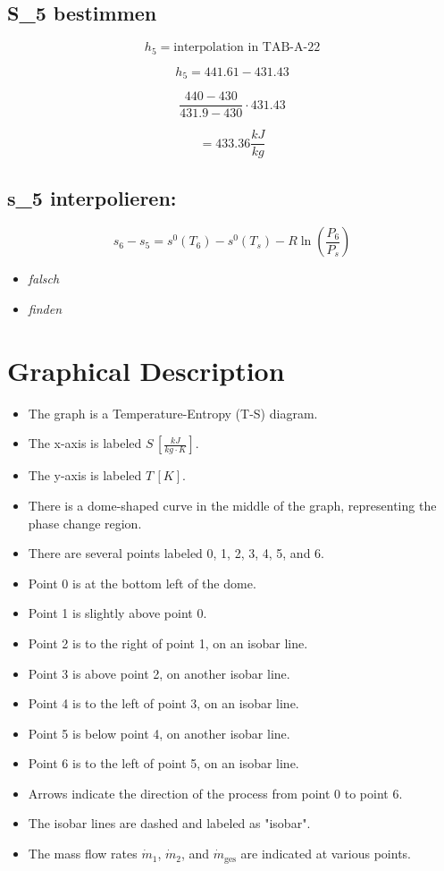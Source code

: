 \subsection*{S_5 bestimmen}

\[
h_5 = \text{interpolation in TAB-A-22}
\]

\[
h_5 = 441.61 - 431.43
\]

\[
\frac{440 - 430}{431.9 - 430} \cdot 431.43
\]

\[
= 433.36 \frac{kJ}{kg}
\]

\subsection*{s_5 interpolieren:}

\[
s_6 - s_5 = s^0 (T_6) - s^0 (T_s) - R \ln \left( \frac{P_6}{P_s} \right)
\]

\begin{itemize}
    \item \textit{falsch}
    \item \textit{finden}
\end{itemize}

\section*{Graphical Description}

\begin{itemize}
    \item The graph is a Temperature-Entropy (T-S) diagram.
    \item The x-axis is labeled $S \, [\frac{kJ}{kg \cdot K}]$.
    \item The y-axis is labeled $T \, [K]$.
    \item There is a dome-shaped curve in the middle of the graph, representing the phase change region.
    \item There are several points labeled 0, 1, 2, 3, 4, 5, and 6.
    \item Point 0 is at the bottom left of the dome.
    \item Point 1 is slightly above point 0.
    \item Point 2 is to the right of point 1, on an isobar line.
    \item Point 3 is above point 2, on another isobar line.
    \item Point 4 is to the left of point 3, on an isobar line.
    \item Point 5 is below point 4, on another isobar line.
    \item Point 6 is to the left of point 5, on an isobar line.
    \item Arrows indicate the direction of the process from point 0 to point 6.
    \item The isobar lines are dashed and labeled as "isobar".
    \item The mass flow rates $\dot{m}_1$, $\dot{m}_2$, and $\dot{m}_{\text{ges}}$ are indicated at various points.
\end{itemize}


